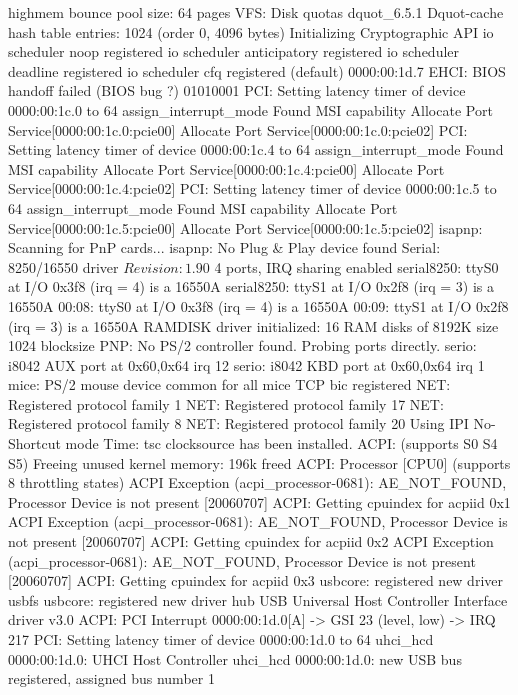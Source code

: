 \documentclass[mingoth,a4paper]{jsarticle}
\begin{document}
{{{{{{{{{{{{{\begin{commandline}
highmem bounce pool size: 64 pages
VFS: Disk quotas dquot_6.5.1
Dquot-cache hash table entries: 1024 (order 0, 4096 bytes)
Initializing Cryptographic API
io scheduler noop registered
io scheduler anticipatory registered
io scheduler deadline registered
io scheduler cfq registered (default)
0000:00:1d.7 EHCI: BIOS handoff failed (BIOS bug ?) 01010001
PCI: Setting latency timer of device 0000:00:1c.0 to 64
assign_interrupt_mode Found MSI capability
Allocate Port Service[0000:00:1c.0:pcie00]
Allocate Port Service[0000:00:1c.0:pcie02]
PCI: Setting latency timer of device 0000:00:1c.4 to 64
assign_interrupt_mode Found MSI capability
Allocate Port Service[0000:00:1c.4:pcie00]
Allocate Port Service[0000:00:1c.4:pcie02]
PCI: Setting latency timer of device 0000:00:1c.5 to 64
assign_interrupt_mode Found MSI capability
Allocate Port Service[0000:00:1c.5:pcie00]
Allocate Port Service[0000:00:1c.5:pcie02]
isapnp: Scanning for PnP cards...
isapnp: No Plug & Play device found
Serial: 8250/16550 driver $Revision: 1.90 $ 4 ports, IRQ sharing enabled
serial8250: ttyS0 at I/O 0x3f8 (irq = 4) is a 16550A
serial8250: ttyS1 at I/O 0x2f8 (irq = 3) is a 16550A
00:08: ttyS0 at I/O 0x3f8 (irq = 4) is a 16550A
00:09: ttyS1 at I/O 0x2f8 (irq = 3) is a 16550A
RAMDISK driver initialized: 16 RAM disks of 8192K size 1024 blocksize
PNP: No PS/2 controller found. Probing ports directly.
serio: i8042 AUX port at 0x60,0x64 irq 12
serio: i8042 KBD port at 0x60,0x64 irq 1
mice: PS/2 mouse device common for all mice
TCP bic registered
NET: Registered protocol family 1
NET: Registered protocol family 17
NET: Registered protocol family 8
NET: Registered protocol family 20
Using IPI No-Shortcut mode
Time: tsc clocksource has been installed.
ACPI: (supports S0 S4 S5)
Freeing unused kernel memory: 196k freed
ACPI: Processor [CPU0] (supports 8 throttling states)
ACPI Exception (acpi_processor-0681): AE_NOT_FOUND, Processor Device is not present [20060707]
ACPI: Getting cpuindex for acpiid 0x1
ACPI Exception (acpi_processor-0681): AE_NOT_FOUND, Processor Device is not present [20060707]
ACPI: Getting cpuindex for acpiid 0x2
ACPI Exception (acpi_processor-0681): AE_NOT_FOUND, Processor Device is not present [20060707]
ACPI: Getting cpuindex for acpiid 0x3
usbcore: registered new driver usbfs
usbcore: registered new driver hub
USB Universal Host Controller Interface driver v3.0
ACPI: PCI Interrupt 0000:00:1d.0[A] -> GSI 23 (level, low) -> IRQ 217
PCI: Setting latency timer of device 0000:00:1d.0 to 64
uhci_hcd 0000:00:1d.0: UHCI Host Controller
uhci_hcd 0000:00:1d.0: new USB bus registered, assigned bus number 1

\end{commandline}}}}}}}}}}}}}}
\end{document}
